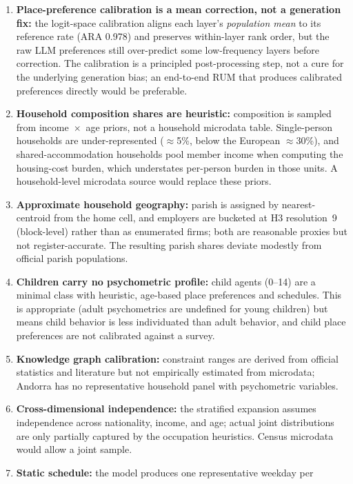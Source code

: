 \documentclass[a4paper,12pt]{article}
\begin{document}
\begin{enumerate}
\item \textbf{Place-preference calibration is a mean correction, not a generation
      fix:} the logit-space calibration aligns each layer's \emph{population mean} to
      its reference rate (ARA 0.978) and preserves within-layer rank order, but the
      raw LLM preferences still over-predict some low-frequency layers before
      correction. The calibration is a principled post-processing step, not a cure
      for the underlying generation bias; an end-to-end RUM that produces calibrated
      preferences directly would be preferable.
\item \textbf{Household composition shares are heuristic:} composition is sampled
      from income~$\times$~age priors, not a household microdata table. Single-person
      households are under-represented ($\approx$5\%, below the European $\approx$30\%),
      and shared-accommodation households pool member income when computing the
      housing-cost burden, which understates per-person burden in those units. A
      household-level microdata source would replace these priors.
\item \textbf{Approximate household geography:} parish is assigned by nearest-centroid
      from the home cell, and employers are bucketed at H3 resolution~9 (block-level)
      rather than as enumerated firms; both are reasonable proxies but not
      register-accurate. The resulting parish shares deviate modestly from official
      parish populations.
\item \textbf{Children carry no psychometric profile:} child agents (0--14) are a
      minimal class with heuristic, age-based place preferences and schedules. This is
      appropriate (adult psychometrics are undefined for young children) but means
      child behavior is less individuated than adult behavior, and child place
      preferences are not calibrated against a survey.
\item \textbf{Knowledge graph calibration:} constraint ranges are derived from
      official statistics and literature but not empirically estimated from microdata;
      Andorra has no representative household panel with psychometric variables.
\item \textbf{Cross-dimensional independence:} the stratified expansion assumes
      independence across nationality, income, and age; actual joint distributions are
      only partially captured by the occupation heuristics. Census microdata would
      allow a joint sample.
\item \textbf{Static schedule:} the model produces one representative weekday per

\end{enumerate}
\end{document}
